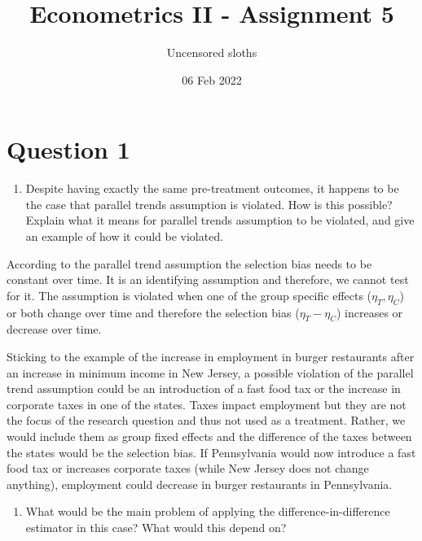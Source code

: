 \documentclass[
]{article}
\title{Econometrics II - Assignment 5}
\author{Uncensored sloths}
\date{06 Feb 2022}
\providecommand{\tightlist}{%
  \setlength{\itemsep}{0pt}\setlength{\parskip}{0pt}}
\begin{document}
\maketitle

\hypertarget{question-1}{%
\section{Question 1}\label{question-1}}

\begin{enumerate}
\def\labelenumi{\roman{enumi})}
\tightlist
\item
  Despite having exactly the same pre-treatment outcomes, it happens to
  be the case that parallel trends assumption is violated. How is this
  possible? Explain what it means for parallel trends assumption to be
  violated, and give an example of how it could be violated.
\end{enumerate}

According to the parallel trend assumption the selection bias needs to
be constant over time. It is an identifying assumption and therefore, we
cannot test for it. The assumption is violated when one of the group
specific effects (\(\eta_T, \eta_C\)) or both change over time and
therefore the selection bias (\(\eta_T - \eta_C\)) increases or decrease
over time.

Sticking to the example of the increase in employment in burger
restaurants after an increase in minimum income in New Jersey, a
possible violation of the parallel trend assumption could be an
introduction of a fast food tax or the increase in corporate taxes in
one of the states. Taxes impact employment but they are not the focus of
the research question and thus not used as a treatment. Rather, we would
include them as group fixed effects and the difference of the taxes
between the states would be the selection bias. If Pennsylvania would
now introduce a fast food tax or increases corporate taxes (while New
Jersey does not change anything), employment could decrease in burger
restaurants in Pennsylvania.

\begin{enumerate}
\def\labelenumi{\roman{enumi})}
\setcounter{enumi}{1}
\tightlist
\item
  What would be the main problem of applying the
  difference-in-difference estimator in this case? What would this
  depend on?
\end{enumerate}
\end{document}
